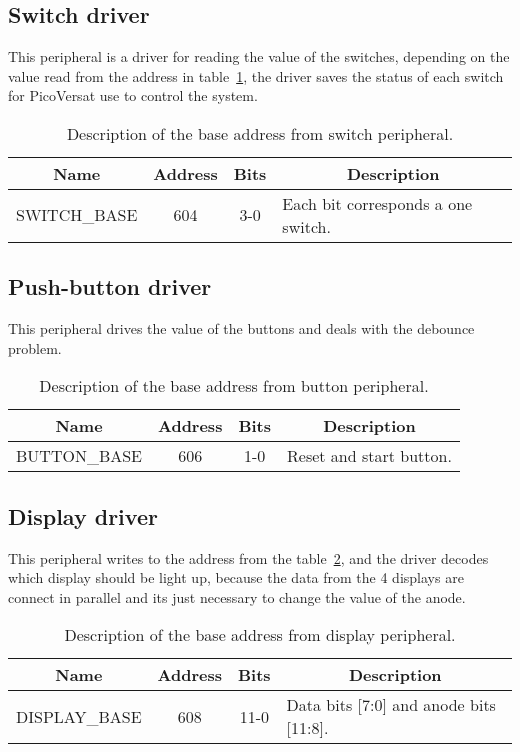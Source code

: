 \subsection{Switch driver}
This peripheral is a driver for reading the value of the switches, depending on the value read from the address in table~\ref{tab:switch}, the driver saves the status of each switch for PicoVersat use to control the system.

\begin{table}[h]
\centering
\begin{tabular}{|l|c|c|l|}
\hline
\multicolumn{1}{|c|}{\bf Name} & {\bf Address} & {\bf Bits} & \multicolumn{1}{c|}{\bf Description} \\ 
\hline \hline
\multicolumn{1}{|l|}{SWITCH\_BASE} & 604 & 3-0 & Each bit corresponds a one switch.\\ 
\hline
\end{tabular}
\caption{Description of the base address from switch peripheral.}
\label{tab:switch}
\end{table}

\clearpage
\subsection{Push-button driver}
This peripheral drives the value of the buttons and deals with the debounce problem.

\begin{table}[h]
\centering
\begin{tabular}{|l|c|c|l|}
\hline
\multicolumn{1}{|c|}{\bf Name} & {\bf Address} & {\bf Bits} & \multicolumn{1}{c|}{\bf Description} \\ 
\hline \hline
\multicolumn{1}{|l|}{BUTTON\_BASE} & 606 & 1-0  & Reset and start button.\\ 
\hline
\end{tabular}
\caption{Description of the base address from button peripheral.}
\label{tab:button}
\end{table}

\subsection{Display driver}
This peripheral writes to the address from the table~\ref{tab:button}, and the driver decodes which display should be light up, because the data from the 4 displays are connect in parallel and its just necessary to change the value of the anode.

\begin{table}[h]
\centering
\begin{tabular}{|l|c|c|l|}
\hline
\multicolumn{1}{|c|}{\bf Name} & {\bf Address} & {\bf Bits} & \multicolumn{1}{c|}{\bf Description} \\ 
\hline \hline
\multicolumn{1}{|l|}{DISPLAY\_BASE} & 608 & 11-0 & Data bits [7:0] and anode bits [11:8].\\ 
\hline
\end{tabular}
\caption{Description of the base address from display peripheral.}
\label{tab:display}
\end{table}
